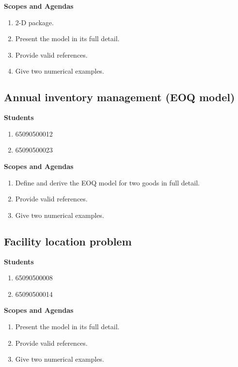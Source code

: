 \documentclass[]{report}
\begin{document}
{\bfseries Scopes and Agendas}
\begin{enumerate}[label=\arabic*., leftmargin=*]
  \item $2$-D package.
  \item Present the model in its full detail.
  \item Provide valid references.
  \item Give two numerical examples.
\end{enumerate}


\subsection*{Annual inventory management (EOQ model)}
{\bfseries Students}
\begin{enumerate}[label=\arabic*., leftmargin=*]
  \item 65090500012
  \item 65090500023
\end{enumerate}

{\bfseries Scopes and Agendas}
\begin{enumerate}[label=\arabic*., leftmargin=*]
  \item Define and derive the EOQ model for two goods in full detail.
  \item Provide valid references.
  \item Give two numerical examples.
\end{enumerate}


\subsection*{Facility location problem}
{\bfseries Students}
\begin{enumerate}[label=\arabic*., leftmargin=*]
  \item 65090500008
  \item 65090500014
\end{enumerate}

{\bfseries Scopes and Agendas}
\begin{enumerate}[label=\arabic*., leftmargin=*]
  \item Present the model in its full detail.
  \item Provide valid references.
  \item Give two numerical examples.
\end{enumerate}
\end{document}
